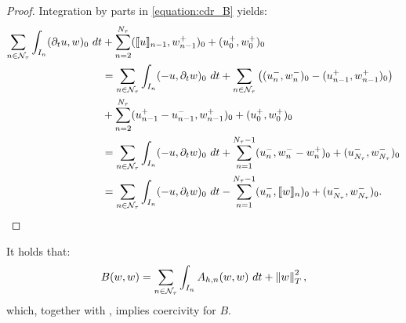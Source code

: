 \begin{proof}
    Integration by parts in \cref{equation:cdr_B} yields:
    \begin{align*}
        \sum_{n \in \mathcal{N}_{\tau}} \int_{I_n} (\partial_t u, w )_0 ~ dt &+ \sum_{n = 2}^{N_{\tau}} (\llbracket u \rrbracket_{n - 1}, w_{n - 1}^+ )_0 + (u_0^+, w_0^+ )_0 \\
        &= \sum_{n \in \mathcal{N}_{\tau}} \int_{I_n} ( -u, \partial_t w )_0 ~ dt + \sum_{n \in \mathcal{N}_{\tau}} \left( (u_n^-, w_n^-)_0 - (u_{n - 1}^+, w_{n - 1}^+)_0 \right) \\
        &+ \sum_{n = 2}^{N_{\tau}} (u_{n - 1}^+ - u_{n - 1}^-, w_{n - 1}^+)_0 + (u_0^+, w_0^+ )_0 \\
        &= \sum_{n \in \mathcal{N}_{\tau}} \int_{I_n} ( -u, \partial_t w )_0 ~ dt + \sum_{n = 1}^{N_{\tau} - 1} (u_n^-, w_n^- - w_n^+)_0 + (u_{N_{\tau}}^-, w_{N_{\tau}}^- )_0 \\
        &= \sum_{n \in \mathcal{N}_{\tau}} \int_{I_n} (-u, \partial_t w )_0 ~ dt - \sum_{n = 1}^{N_{\tau} - 1} (u_n^-, \llbracket w \rrbracket_n )_0 + (u_{N_{\tau}}^-, w_{N_{\tau}}^-)_0.
    \end{align*}
\end{proof}

\begin{lemma}[Coercivity of $B$]
    It holds that:
    \begin{align}
        B(w, w) = \sum_{n \in \mathcal{N}_{\tau}} \int_{I_n} A_{h, n}(w, w) ~ dt + \left\lVert w \right\rVert_{T}^2,
    \end{align}
    which, together with , implies coercivity for $B$.
\end{lemma}

